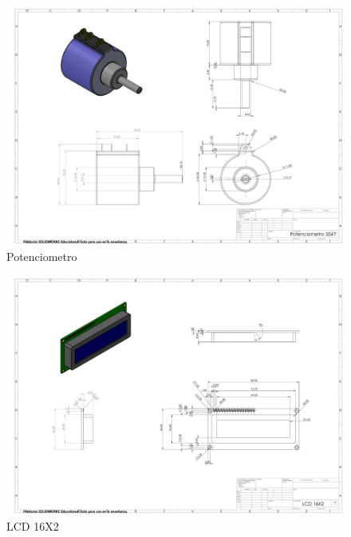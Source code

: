     \begin{figure}[H]
        \centering
        \includegraphics[trim = {10mm 10mm 10mm 10mm},clip,scale=0.120]{24/Img/Potenciometro.pdf}
        \caption{Potenciometro}
        \label{fig:Potenciometro}
    \end{figure}
    \begin{figure}[H]
        \centering
       \includegraphics[trim = {10mm 10mm 10mm 10mm},clip,scale=0.120]{24/Img/LCD16X2.pdf}
        \caption{LCD 16X2}
        \label{fig:LCD 16X2}
    \end{figure}

